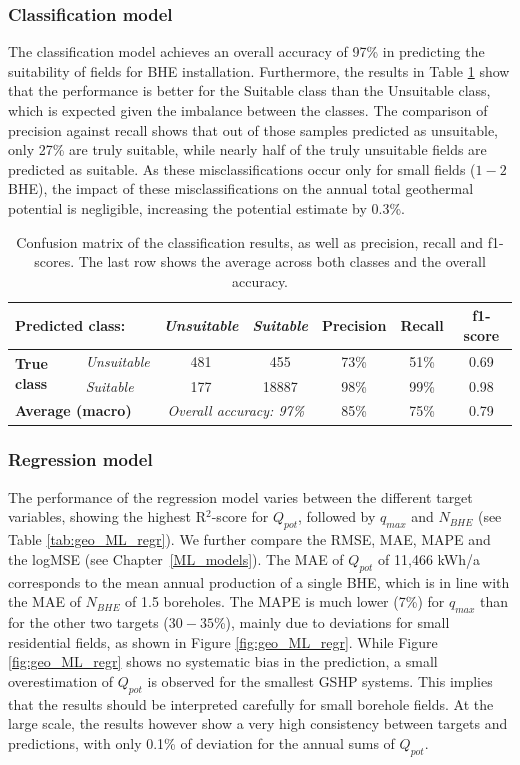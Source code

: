 \subsubsection{Classification model}
The classification model achieves an overall accuracy of 97\% in predicting the suitability of fields for BHE installation. Furthermore, the results in Table \ref{tab:geo_ML_class} show that the performance is better for the Suitable class than the Unsuitable class, which is expected given the imbalance between the classes. The comparison of precision against recall shows that out of those samples predicted as unsuitable, only 27\% are truly suitable, while nearly half of the truly unsuitable fields are predicted as suitable. As these misclassifications occur only for small fields ($1-2$ BHE), the impact of these misclassifications on the annual total geothermal potential is negligible, increasing the potential estimate by 0.3\%.

\begin{table}[tb]
\centering
\footnotesize
\caption{Confusion matrix of the classification results, as well as precision, recall and f1-scores. The last row shows the average across both classes and the overall accuracy.}
\label{tab:geo_ML_class}
\begin{tabular}{llccccc}
\hline
\multicolumn{2}{l}{\textbf{Predicted   class:}} & \textit{Unsuitable} & \textit{Suitable} & \textbf{Precision} & \textbf{Recall} & \textbf{f1-score} \\ \hline
\multirow{2}{*}{\textbf{True   class}} & \textit{Unsuitable} & 481 & 455 & 73\% & 51\% & 0.69 \\
 & \textit{Suitable} & 177 & 18887 & 98\% & 99\% & 0.98 \\
\multicolumn{2}{l}{\textbf{Average (macro)}} & \multicolumn{2}{c}{\textit{Overall accuracy: 97\%}} & 85\% & 75\% & 0.79 \\ \hline
\end{tabular}%
\end{table}

\subsubsection{Regression model}
The performance of the regression model varies between the different target variables, showing the highest R$^2$-score for $Q_{pot}$, followed by $q_{max}$ and $N_{BHE}$ (see Table \ref{tab:geo_ML_regr}). We further compare the RMSE, MAE, MAPE and the logMSE (see Chapter~\ref{ML_models}). The MAE of $Q_{pot}$ of 11,466 kWh/a corresponds to the mean annual production of a single BHE, which is in line with the MAE of $N_{BHE}$ of 1.5 boreholes. The MAPE is much lower (7\%) for $q_{max}$ than for the other two targets ($30-35$\%), mainly due to deviations for small residential fields, as shown in Figure \ref{fig:geo_ML_regr}. While Figure \ref{fig:geo_ML_regr} shows no systematic bias in the prediction, a small overestimation of $Q_{pot}$ is observed for the smallest GSHP systems. This implies that the results should be interpreted carefully for small borehole fields. At the large scale, the results however show a very high consistency between targets and predictions, with only 0.1\% of deviation for the annual sums of $Q_{pot}$. 

